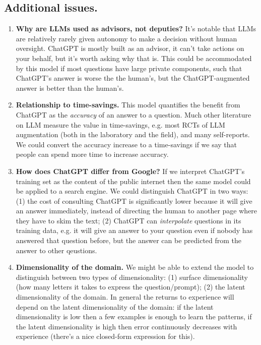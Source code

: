 \documentclass[\ifdraft draft\fi]{article}
\begin{document}
\subsection{Additional issues.}

\begin{enumerate}
   \item \textbf{Why are LLMs used as advisors, not deputies?} It's notable that LLMs are relatively rarely given autonomy to make a decision without human oversight. ChatGPT is mostly built as an advisor, it can't take actions on your behalf, but it's worth asking why that is. This could be accommodated by this model if most questions have large private components, such that ChatGPT's answer is worse the the human's, but the ChatGPT-augmented answer is better than the human's.
   
   \item \textbf{Relationship to time-savings.} This model quantifies the benefit from ChatGPT as the \textit{accuracy} of an answer to a question. Much other literature on LLM measure the value in time-savings, e.g. most RCTs of LLM augmentation (both in the laboratory and the field), and many self-reports. We could convert the accuracy increase to a time-savings if we say that people can spend more time to increase accuracy.

   \item \textbf{How does ChatGPT differ from Google?} If we interpret ChatGPT's training set as the content of the public internet then the same model could be applied to a search engine. We could distinguish ChatGPT in two ways: (1) the cost of consulting ChatGPT is significantly lower because it will give an answer immediately, instead of directing the human to another page where they have to skim the text; (2) ChatGPT can \textit{interpolate} questions in its training data, e.g. it will give an answer to your question even if nobody has answered that question before, but the answer can be predicted from the answer to other qeustions.
   
   \item \textbf{Dimensionality of the domain.} We might be able to extend the model to distinguish between two types of dimensionality: (1) surface dimensionality (how many letters it takes to express the question/prompt); (2) the latent dimensionality of the domain. In general the returns to experience will depend on the latent dimensionality of the domain: if the latent dimensionality is low then a few examples is enough to learn the patterns, if the latent dimensionality is high then error continuously decreases with experience (there's a nice closed-form expression for this).


\end{enumerate}
\end{document}

